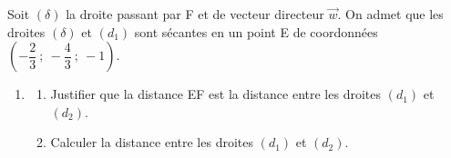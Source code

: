 \documentclass[10pt]{article}
\providecommand{\vect}[1]{\overrightarrow{#1}}
\begin{document}
Soit $(\delta)$ la droite passant par F et de vecteur directeur $\vect{w}$. On admet que les droites $(\delta)$ et $(d_1)$ sont sécantes en un point E de coordonnées $\left( -\dfrac23~;~- \dfrac43~;~-1\right)$.

	\begin{enumerate}[resume]
\item 
	\begin{enumerate}
		\item Justifier que la distance EF est la distance entre les droites $(d_1)$ et $(d_2)$. 
		\item Calculer la distance entre les droites $(d_1)$ et $(d_2)$.
	\end{enumerate}
\end{enumerate}
\end{document}
